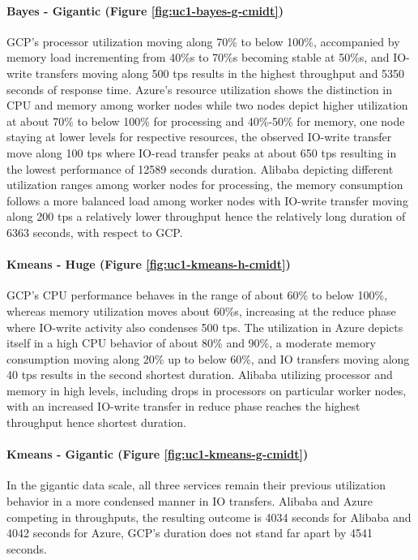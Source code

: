 \documentclass[review]{elsarticle}
\begin{document}
\paragraph{Bayes - Gigantic (Figure \ref{fig:uc1-bayes-g-cmidt})}GCP's processor utilization moving along 70\% to below 100\%, accompanied by memory load incrementing from 40\%s to 70\%s becoming stable at 50\%s, and IO-write transfers moving along 500 tps results in the highest throughput and 5350 seconds of response time. Azure's resource utilization shows the distinction in CPU and memory among worker nodes while two nodes depict higher utilization at about 70\% to below 100\% for processing and 40\%-50\% for memory, one node staying at lower levels for respective resources, the observed IO-write transfer move along 100 tps where IO-read transfer peaks at about 650 tps resulting in the lowest performance of 12589 seconds duration. Alibaba depicting different utilization ranges among worker nodes for processing, the memory consumption follows a more balanced load among worker nodes with IO-write transfer moving along 200 tps a relatively lower throughput hence the relatively long duration of 6363 seconds, with respect to GCP.

\paragraph{Kmeans - Huge (Figure \ref{fig:uc1-kmeans-h-cmidt})}GCP's CPU performance behaves in the range of about 60\% to below 100\%, whereas memory utilization moves about 60\%s, increasing at the reduce phase where IO-write activity also condenses 500 tps. The utilization in Azure depicts itself in a high CPU behavior of about 80\% and 90\%, a moderate memory consumption moving along 20\% up to below 60\%, and IO transfers moving along 40 tps results in the second shortest duration. Alibaba utilizing processor and memory in high levels, including drops in processors on particular worker nodes, with an increased IO-write transfer in reduce phase reaches the highest throughput hence shortest duration.

\paragraph{Kmeans - Gigantic (Figure \ref{fig:uc1-kmeans-g-cmidt})}In the gigantic data scale, all three services remain their previous utilization behavior in a more condensed manner in IO transfers. Alibaba and Azure competing in throughputs, the resulting outcome is 4034 seconds for Alibaba and 4042 seconds for Azure, GCP's duration does not stand far apart by 4541 seconds.
\end{document}
